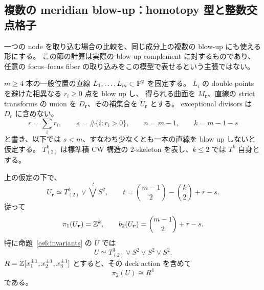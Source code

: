 \subsection{複数の meridian blow-up：homotopy 型と整数交点格子}
\label{cs7:meridian-section}

一つの node を取り込む場合の比較を、同じ成分上の複数の blow-up にも使える形にする。
この節の計算は実際の blow-up complement に対するものであり、任意の focus--focus
fiber の取り込みをこの模型で表せるという主張ではない。

$m\geq4$ 本の一般位置の直線 $L_1,\ldots,L_m\subset\mathbb P^2$ を固定する。
$L_i$ の double points を避けた相異なる $r_i\geq0$ 点を blow up し、
得られる曲面を $M_{\boldsymbol r}$、直線の strict transforms の union を
$D_{\boldsymbol r}$、その補集合を $U_{\boldsymbol r}$ とする。
exceptional divisors は $D_{\boldsymbol r}$ に含めない。
\[
 r=\sum_i r_i,\qquad s=\#\{i:r_i>0\},\qquad
 n=m-1,\qquad k=m-1-s
\]
と書き、以下では $s<m$、すなわち少なくとも一本の直線を blow up しないと仮定する。
$T^k_{(2)}$ は標準積 CW 構造の $2$-skeleton を表し、$k\leq2$ では $T^k$ 自身とする。

\begin{proposition}
\label{cs7:homotopy}
上の仮定の下で、
\begin{equation}\label{cs7:wedge}
 U_{\boldsymbol r}\simeq
 T^k_{(2)}\vee\bigvee^{\,t}S^2,
 \qquad
 t=\binom{m-1}{2}-\binom{k}{2}+r-s.
\end{equation}
従って
\[
 \pi_1(U_{\boldsymbol r})=\mathbb Z^k,\qquad
 b_2(U_{\boldsymbol r})=\binom{m-1}{2}+r-s.
\]
特に命題~\ref{cs6:invariants} の $U$ では
\begin{equation}\label{cs7:sextic-wedge}
 U\simeq T^3_{(2)}\vee S^2\vee S^2\vee S^2.
\end{equation}
$R=\mathbb Z[x_1^{\pm1},x_2^{\pm1},x_3^{\pm1}]$ とすると、その deck action を含めて
\begin{equation}\label{cs7:sextic-pi2}
 \pi_2(U)\cong R^4
\end{equation}
である。
\end{proposition}

